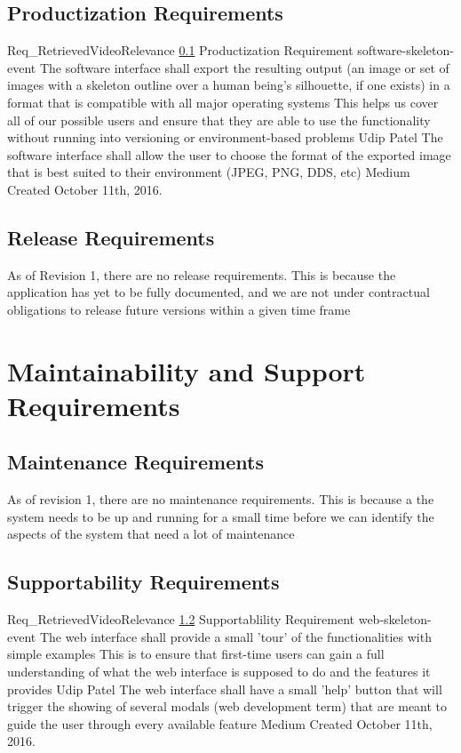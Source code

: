 \documentclass{scrreprt}
\begin{document}
\subsection{Productization Requirements}
\label{req-product}

\requirement
{Req_RetrievedVideoRelevance}
{\ref{req-product} Productization Requirement}
{software-skeleton-event}
{The software interface shall export the resulting output (an image or set of images with a skeleton outline over a human being's silhouette, if one exists) in a format that is compatible with all major operating systems }
{This helps us cover all of our possible users and ensure that they are able to use the functionality without running into versioning or environment-based problems}
{Udip Patel}
{The software interface shall allow the user to choose the format of the exported image that is best suited to their environment (JPEG, PNG, DDS, etc) }
{Medium}
{Created October 11th, 2016.}




\subsection{Release Requirements}
\label{req-release}
As of Revision 1, there are no release requirements. This is because the application has yet to be fully documented, and we are not under contractual obligations to release future versions within a given time frame


\section{Maintainability and Support Requirements}

\subsection{Maintenance Requirements}
\label{req-maintenance}

As of revision 1, there are no maintenance requirements. This is because a the system needs to be up and running for a small time before we can identify the aspects of the system that need a lot of maintenance

\subsection{Supportability Requirements}
\label{req-supportability}

\requirement
{Req_RetrievedVideoRelevance}
{\ref{req-supportability} Supportablility Requirement}
{web-skeleton-event}
{The web interface shall provide a small 'tour' of the functionalities with simple examples}
{This is to ensure that first-time users can gain a full understanding of what the web interface is supposed to do and the features it provides}
{Udip Patel}
{The web interface shall have a small 'help' button that will trigger the showing of several modals (web development term) that are meant to guide the user through every available feature}
{Medium}
{Created October 11th, 2016.}
\end{document}
